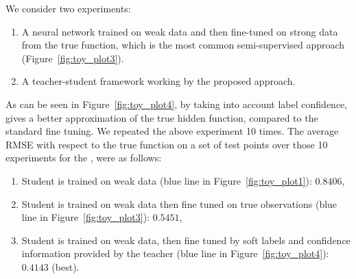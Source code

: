 We consider two experiments: 
\begin{enumerate}[leftmargin=*]
\setlength{\topsep}{0.3pt}
\setlength{\partopsep}{0.3pt}
\setlength{\itemsep}{0.3pt}
\setlength{\parskip}{0.3pt}
\setlength{\parsep}{0.3pt}
    \item A neural network trained on weak data and then fine-tuned on strong data from the true function, which is the most common semi-supervised approach (Figure~\ref{fig:toy_plot3}).
    \item A teacher-student framework working by the proposed \fwl approach.
\end{enumerate} 

As can be seen in Figure~\ref{fig:toy_plot4}, by taking into account label confidence, \fwl gives a better approximation of the true hidden function, compared to the standard fine tuning.  We repeated the above experiment 10 times. The average RMSE with respect to the true function on a set of test points over those 10 experiments for the \std, were as follows:
\begin{enumerate}[leftmargin=*]
\setlength{\topsep}{0.3pt}
\setlength{\partopsep}{0.3pt}
\setlength{\itemsep}{0.3pt}
\setlength{\parskip}{0.3pt}
\setlength{\parsep}{0.3pt}
    \item Student is trained on weak data (blue line in Figure~\ref{fig:toy_plot1}): $0.8406$,
    \item Student is trained on weak data then fine tuned on true observations (blue line in Figure~\ref{fig:toy_plot3}): $0.5451$,
    \item Student is trained on weak data, then fine tuned by soft labels and confidence information provided by the teacher (blue line in Figure~\ref{fig:toy_plot4}): $0.4143$ (best).
\end{enumerate}